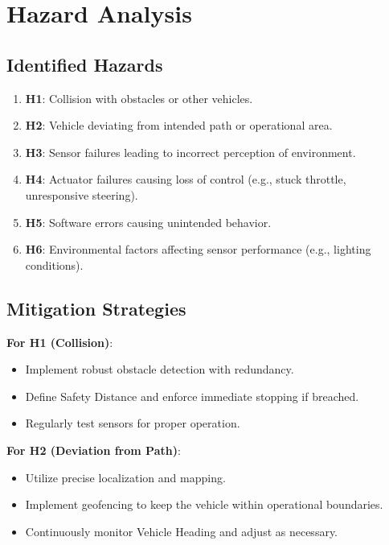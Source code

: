 \documentclass[12pt]{article}
\begin{document}
\section{Hazard Analysis}

\subsection{Identified Hazards}

\begin{enumerate}
    \item \textbf{H1}: Collision with obstacles or other vehicles.
    \item \textbf{H2}: Vehicle deviating from intended path or operational area.
    \item \textbf{H3}: Sensor failures leading to incorrect perception of environment.
    \item \textbf{H4}: Actuator failures causing loss of control (e.g., stuck throttle, unresponsive steering).
    \item \textbf{H5}: Software errors causing unintended behavior.
    \item \textbf{H6}: Environmental factors affecting sensor performance (e.g., lighting conditions).
\end{enumerate}

\subsection{Mitigation Strategies}

\textbf{For H1 (Collision)}:

\begin{itemize}
    \item Implement robust obstacle detection with redundancy.
    \item Define Safety Distance and enforce immediate stopping if breached.
    \item Regularly test sensors for proper operation.
\end{itemize}

\textbf{For H2 (Deviation from Path)}:

\begin{itemize}
    \item Utilize precise localization and mapping.
    \item Implement geofencing to keep the vehicle within operational boundaries.
    \item Continuously monitor Vehicle Heading and adjust as necessary.
\end{itemize}
\end{document}

